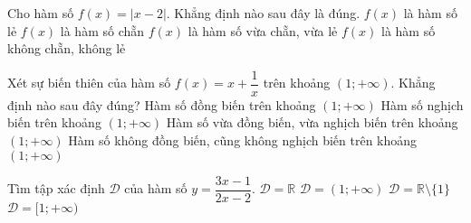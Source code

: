 \begin{ex}%
    Cho hàm số $f(x)=\left| x-2\right|.$ Khẳng định nào sau đây là đúng.
    \choice
    {$f(x)$ là hàm số lẻ}
    {$f(x)$ là hàm số chẵn}
    {$f(x)$ là hàm số vừa chẵn, vừa lẻ}
    {\True $f(x)$ là hàm số không chẵn, không lẻ}
\end{ex}

\begin{ex}%
    Xét sự biến thiên của hàm số $f(x)=x+\dfrac{1}{x}$ trên khoảng $\left(1;+\infty \right)$. Khẳng định nào sau đây đúng?
    \choice
    {\True Hàm số đồng biến trên khoảng $\left(1;+\infty \right)$}
    {Hàm số nghịch biến trên khoảng $\left(1;+\infty \right)$}
    {Hàm số vừa đồng biến, vừa nghịch biến trên khoảng $\left(1;+\infty \right)$}
    {Hàm số không đồng biến, cũng không nghịch biến trên khoảng $\left(1;+\infty \right)$}
\end{ex}

\begin{ex}%
    Tìm tập xác định $\mathscr{D}$ của hàm số $y=\dfrac{3x-1}{2x-2}$.
    \choice
    {$\mathscr{D}=\mathbb{R}$}
    {$\mathscr{D}=(1;+\infty)$}
    {\True $\mathscr{D}=\mathbb{R}\setminus\{1\}$}
    {$\mathscr{D}=[1;+\infty)$}
\end{ex}

